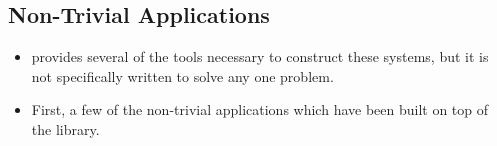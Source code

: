 \subsection*{Non-Trivial Applications}
\begin{frame}%
  \begin{itemize}%
  \item{\libMesh{} provides several of the tools necessary to construct
    these systems, but it is not specifically written to solve any one
    problem.}

  \item{First, a few of the non-trivial applications which have been built on
    top of the library.}
    

  \end{itemize}
\end{frame}	  
